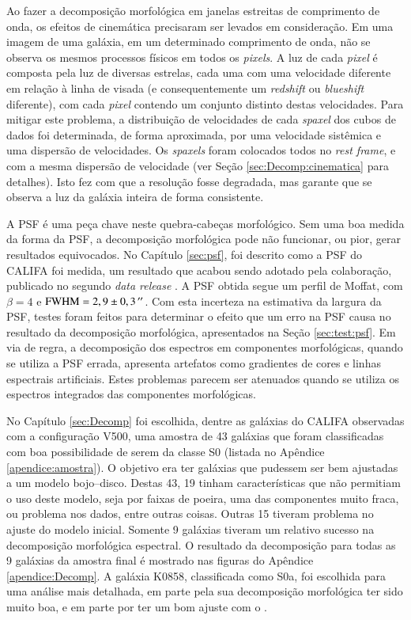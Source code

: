 Ao fazer a decomposição morfológica em janelas estreitas de comprimento de onda,
os efeitos de cinemática precisaram ser levados em consideração. Em uma imagem
de uma galáxia, em um determinado comprimento de onda, não se observa os mesmos
processos físicos em todos os {\em pixels}. A luz de cada {\em pixel} é composta
pela luz de diversas estrelas, cada uma com uma velocidade diferente em relação
à linha de visada (e consequentemente um {\em redshift} ou {\em blueshift}
diferente), com cada {\em pixel} contendo um conjunto distinto destas
velocidades. Para mitigar este problema, a distribuição de velocidades de cada
{\em spaxel} dos cubos de dados foi determinada, de forma aproximada, por uma
velocidade sistêmica e uma dispersão de velocidades. Os {\em spaxels} foram
colocados todos no {\em rest frame}, e com a mesma dispersão de velocidade (ver
Seção \ref{sec:Decomp:cinematica} para detalhes). Isto fez com que a resolução
fosse degradada, mas garante que se observa a luz da galáxia inteira de forma
consistente.

A PSF é uma peça chave neste quebra-cabeças morfológico. Sem uma boa medida da
forma da PSF, a decomposição morfológica pode não funcionar, ou pior, gerar
resultados equivocados. No Capítulo \ref{sec:psf}, foi descrito como  a PSF do
CALIFA foi medida, um resultado que acabou sendo adotado pela colaboração,
publicado no segundo {\em data release} \citep{GarciaBenito2015}. A PSF obtida
segue um perfil de Moffat, com $\beta = 4$ e $\mathrm{FWHM}=2,9 \pm 0,3\,^{\prime\prime}$.
Com esta incerteza na estimativa da largura da PSF, testes foram feitos para
determinar o efeito que um erro na PSF causa no resultado da decomposição
morfológica, apresentados na Seção \ref{sec:test:psf}. Em via de regra, a
decomposição dos espectros em componentes morfológicas, quando se utiliza a PSF
errada, apresenta artefatos como gradientes de cores e linhas espectrais
artificiais. Estes problemas parecem ser atenuados quando se utiliza os
espectros integrados das componentes morfológicas.

No Capítulo \ref{sec:Decomp} foi escolhida, dentre as galáxias do CALIFA
observadas com a configuração V500, uma amostra de 43 galáxias que foram
classificadas com boa possibilidade de serem da classe S0 (listada no Apêndice
\ref{apendice:amostra}). O objetivo era ter galáxias que pudessem ser bem
ajustadas a um modelo bojo--disco. Destas 43, 19 tinham características que não
permitiam o uso deste modelo, seja por faixas de poeira, uma das componentes
muito fraca, ou problema nos dados, entre outras coisas. Outras 15 tiveram
problema no ajuste do modelo inicial. Somente 9 galáxias tiveram um relativo
sucesso na decomposição morfológica espectral. O resultado da decomposição para
todas as 9 galáxias da amostra final é mostrado nas figuras do Apêndice
\ref{apendice:Decomp}. A galáxia K0858, classificada como S0a, foi escolhida
para uma análise mais detalhada, em parte pela sua decomposição morfológica ter
sido muito boa, e em parte por ter um bom ajuste com o \starlight.


